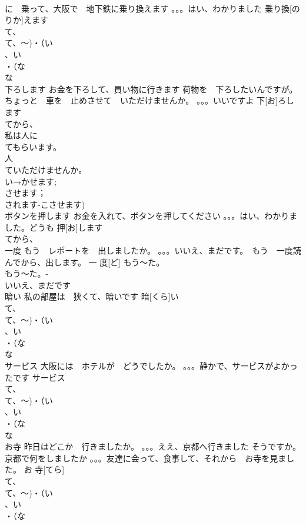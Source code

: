 \documentclass[8pt]{extreport}
\begin{document}
\begin{CJK}{UTF8}{min}
\\	に　乗って、大阪で　地下鉄に乗り換えます 。。。はい、わかりました	乗り換[のりか]えます			
\\	て、
\\	て、～)・（い
\\	、い
\\	・（な
\\	な
\\	下ろします	お金を下ろして、買い物に行きます 荷物を　下ろしたいんですが。ちょっと　車を　止めさせて　いただけませんか。 。。。いいですよ	下[お]ろします			
\\	てから、
\\	私は人に
\\	てもらいます。
\\	人
\\	ていただけませんか。
\\	い→かせます;
\\	させます；
\\	されます-こさせます)
\\	ボタンを押します	お金を入れて、ボタンを押してください 。。。はい、わかりました。どうも	押[お]します				
\\	てから、
\\	一度	もう　レポートを　出しましたか。 。。。いいえ、まだです。　もう　一度読んでから、出します。	一 度[ど]				もう～た。
\\	もう～た。- 
\\	いいえ、まだです 
\\	暗い	私の部屋は　狭くて、暗いです	暗[くら]い			
\\	て、
\\	て、～)・（い
\\	、い
\\	・（な
\\	な
\\	サービス	大阪には　ホテルが　どうでしたか。 。。。静かで、サービスがよかったです	サービス			
\\	て、
\\	て、～)・（い
\\	、い
\\	・（な
\\	な
\\	お寺	昨日はどこか　行きましたか。 。。。ええ、京都へ行きました そうですか。京都で何をしましたか 。。。友達に会って、食事して、それから　お寺を見ました。	お 寺[てら]			
\\	て、
\\	て、～)・（い
\\	、い
\\	・（な

\end{CJK}
\end{document}
